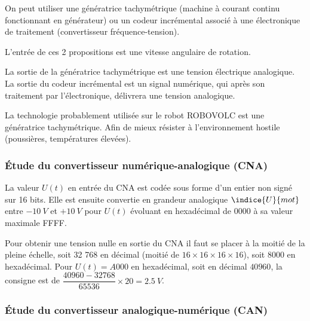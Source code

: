\ifprof
\begin{corrige}
 On peut utiliser une génératrice tachymétrique (machine à courant continu fonctionnant en générateur) ou un codeur incrémental associé à une électronique de traitement (convertisseur fréquence-tension).

L’entrée de ces 2 propositions est une vitesse angulaire de rotation.

La sortie de la génératrice tachymétrique est une tension électrique analogique. La sortie du codeur incrémental est un signal numérique, qui après son traitement par l’électronique, délivrera une tension analogique.

La technologie probablement utilisée sur le robot ROBOVOLC est une génératrice tachymétrique. Afin de mieux résister à l’environnement hostile (poussières, températures élevées).

\end{corrige}
\else
\fi

\subsubsection{Étude du convertisseur numérique-analogique (CNA)}

La valeur $U (t)$ en entrée du CNA est codée sous forme d'un entier non signé sur 16 bits. Elle est
ensuite convertie en grandeur analogique $\indice{U}{mot}$ entre $-\SI{10}{V}$ et $+\SI{10}{V}$ pour $U (t)$ évoluant en
hexadécimal de 0000 à sa valeur maximale FFFF.

\ifprof
\begin{corrige}
Pour obtenir une tension nulle en sortie du CNA il faut se placer à la moitié de la pleine échelle, soit 32 768 en décimal (moitié de $16\times 16\times  16\times  16$), soit 8000 en hexadécimal.
Pour $U (t) = A000$ en hexadécimal, soit en décimal $40 960$, la consigne est de  $\dfrac{40960-32768}{65536}\times 20= \SI{2,5}{V}$.

\end{corrige}
\else
\fi

\subsubsection{Étude du convertisseur analogique-numérique (CAN)}


